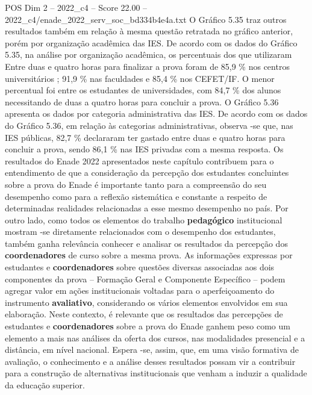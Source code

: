 \begin{textsample}{POS Dim 2 – 2022\_c4 – Score 22.00 – 2022\_c4/enade\_2022\_serv\_soc\_bd334b4e4a.txt}
O Gráfico 5.35 traz outros resultados também em relação à mesma questão retratada no gráfico anterior, porém por organização acadêmica das IES.
De acordo com os dados do Gráfico 5.35, na análise por organização acadêmica, os percentuais dos que utilizaram Entre duas e quatro horas para finalizar a prova foram de 85,9 \% nos centros universitários ; 91,9 \% nas faculdades e 85,4 \% nos CEFET/IF.
O menor percentual foi entre os estudantes de universidades, com 84,7 \% dos alunos necessitando de duas a quatro horas para concluir a prova.
O Gráfico 5.36 apresenta os dados por categoria administrativa das IES.
De acordo com os dados do Gráfico 5.36, em relação às categorias administrativas, observa -se que, nas IES públicas, 82,7 \% declararam ter gastado entre duas e quatro horas para concluir a prova, sendo 86,1 \% nas IES privadas com a mesma resposta.
Os resultados do Enade 2022 apresentados neste capítulo contribuem para o entendimento de que a consideração da percepção dos estudantes concluintes sobre a prova do Enade é importante tanto para a compreensão do seu desempenho como para a reflexão sistemática e constante a respeito de determinadas realidades relacionadas a esse mesmo desempenho no país.
Por outro lado, como todos os elementos do trabalho \textbf{pedagógico} institucional mostram -se diretamente relacionados com o desempenho dos estudantes, também ganha relevância conhecer e analisar os resultados da percepção dos \textbf{coordenadores} de curso sobre a mesma prova.
As informações expressas por estudantes e \textbf{coordenadores} sobre questões diversas associadas aos dois componentes da prova – Formação Geral e Componente Específico – podem agregar valor em ações institucionais voltadas para o aperfeiçoamento do instrumento \textbf{avaliativo}, considerando os vários elementos envolvidos em sua elaboração.
Neste contexto, é relevante que os resultados das percepções de estudantes e \textbf{coordenadores} sobre a prova do Enade ganhem peso como um elemento a mais nas análises da oferta dos cursos, nas modalidades presencial e a distância, em nível nacional.
Espera -se, assim, que, em uma visão formativa de avaliação, o conhecimento e a análise desses resultados possam vir a contribuir para a construção de alternativas institucionais que venham a induzir a qualidade da educação superior.

\end{textsample}
